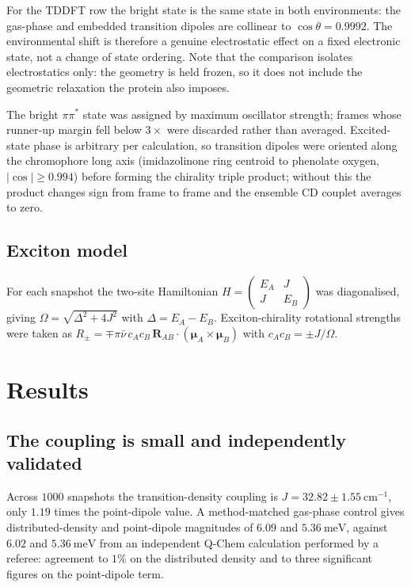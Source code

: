 \documentclass[journal=jpcbfk, manuscript=article, layout=twocolumn, doi=true]{achemso}
\begin{document}
For the TDDFT row the bright state is the same state in both environments: the
gas-phase and embedded transition dipoles are collinear to
$\cos\theta = 0.9992$. The
environmental shift is therefore a genuine electrostatic effect on a fixed
electronic state, not a change of state ordering. Note that the comparison
isolates electrostatics only: the geometry is held frozen, so it does not
include the geometric relaxation the protein also imposes.

The bright $\pi\pi^{*}$ state was assigned by maximum oscillator strength;
frames whose runner-up margin fell below $3\times$ were discarded rather than
averaged. Excited-state phase is arbitrary per calculation, so transition
dipoles were oriented along the chromophore long axis (imidazolinone ring
centroid to phenolate oxygen, $|\!\cos| \ge 0.994$) before forming the
chirality triple product; without this the product changes sign from frame to
frame and the ensemble CD couplet averages to zero.

\subsection{Exciton model}

For each snapshot the two-site Hamiltonian
$H = \left(\begin{smallmatrix} E_{A} & J \\ J & E_{B}\end{smallmatrix}\right)$ was
diagonalised, giving $\Omega = \sqrt{\Delta^{2} + 4J^{2}}$ with
$\Delta = E_{A}-E_{B}$. Exciton-chirality rotational strengths were taken as
$R_{\pm} = \mp\pi\bar\nu\,c_{A}c_{B}\,\mathbf{R}_{AB}\cdot(\bm\mu_{A}\times\bm\mu_{B})$
with $c_{A}c_{B} = \pm J/\Omega$.

\section{Results}

\subsection{The coupling is small and independently validated}

Across $1000$ snapshots the transition-density coupling is
$J = 32.82 \pm 1.55~\mathrm{cm^{-1}}$, only $1.19$ times the point-dipole
value. A method-matched gas-phase control gives distributed-density and
point-dipole magnitudes of $6.09$ and $5.36~\mathrm{meV}$, against
$6.02$ and $5.36~\mathrm{meV}$ from an independent Q-Chem calculation
performed by a referee: agreement to $1\%$ on the distributed density and to
three significant figures on the point-dipole term.
\end{document}
